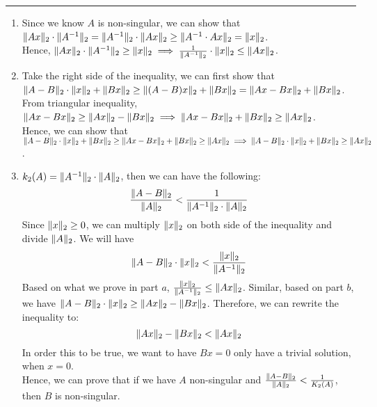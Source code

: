\documentclass[11pt]{article}
\begin{document}





\begin{quote}

\end{quote}
\hrule


\begin{solution}
\item
\begin{enumerate}
    \item   Since we know $A$ is non-singular, we can show that $\norm{Ax}_2 \cdot \norm{A^{-1}}_2 = \norm{A^{-1}}_2 \cdot \norm{Ax}_2 \geq \norm{A^{-1} \cdot Ax}_2 = \norm{x}_2$. \\
    Hence, $\norm{Ax}_2 \cdot \norm{A^{-1}}_2 \geq \norm{x}_2 \implies \frac{1}{\norm{A^{-1}}_2} \cdot \norm{x}_2 \leq \norm{Ax}_2$. 
    
    \item   Take the right side of the inequality, we can first show that $\norm{A-B}_2 \cdot \norm{x}_2 + \norm{Bx}_2 \geq \norm{(A-B)x}_2 + \norm{Bx}_2 = \norm{Ax - Bx}_2 + \norm{Bx}_2$. \\
    From triangular inequality, $\norm{Ax - Bx}_2 \geq \norm{Ax}_2 - \norm{Bx}_2 \implies \norm{Ax - Bx}_2 + \norm{Bx}_2 \geq \norm{Ax}_2$.\\
    Hence, we can show that $\norm{A-B}_2 \cdot \norm{x}_2 + \norm{Bx}_2 \geq \norm{Ax - Bx}_2 + \norm{Bx}_2 \geq \norm{Ax}_2 \implies \norm{A-B}_2 \cdot \norm{x}_2 + \norm{Bx}_2 \geq \norm{Ax}_2$.
    
    \item   $k_2(A) = \norm{A^{-1}}_2 \cdot \norm{A}_2$, then we can have the following:
    $$ \frac{\norm{A-B}_2}{\norm{A}_2} < \frac{1}{\norm{A^{-1}}_2 \cdot \norm{A}_2} $$ 
    Since $\norm{x}_2 \geq 0$, we can multiply $\norm{x}_2$ on both side of the inequality and divide $\norm{A}_2$. We will have $$ \norm{A-B}_2 \cdot \norm{x}_2 < \frac{\norm{x}_2}{\norm{A^{-1}}_2}$$
    Based on what we prove in part $a$, $\frac{\norm{x}_2}{\norm{A^{-1}}_2} \leq \norm{Ax}_2$. Similar, based on part $b$, we have $\norm{A-B}_2 \cdot \norm{x}_2 \geq \norm{Ax}_2 - \norm{Bx}_2$. Therefore, we can rewrite the inequality to:
    $$ \norm{Ax}_2 - \norm{Bx}_2 < \norm{Ax}_2 $$
    In order this to be true, we want to have $Bx = 0$ only have a trivial solution, when $x = 0$. \\
    Hence, we can prove that if we have $A$ non-singular and $\frac{\norm{A-B}_2}{\norm{A}_2} < \frac{1}{K_2(A)}$, then $B$ is non-singular.
        
    \end{enumerate}
\end{solution}
\end{document}
